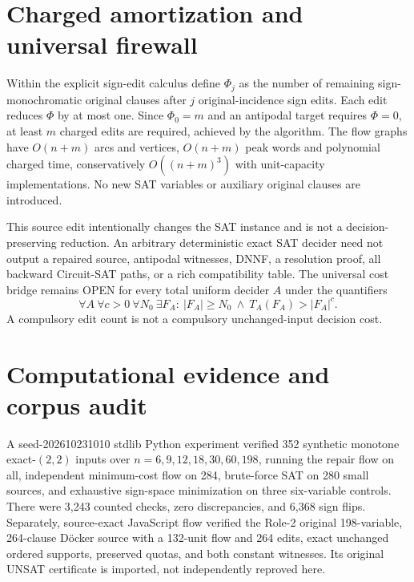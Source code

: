 \documentclass[11pt]{article}
\begin{document}
\section{Charged amortization and universal firewall}
Within the explicit sign-edit calculus define $\Phi_j$ as the number of remaining sign-monochromatic original clauses after $j$ original-incidence sign edits. Each edit reduces $\Phi$ by at most one. Since $\Phi_0=m$ and an antipodal target requires $\Phi=0$, at least $m$ charged edits are required, achieved by the algorithm. The flow graphs have $O(n+m)$ arcs and vertices, $O(n+m)$ peak words and polynomial charged time, conservatively $O((n+m)^3)$ with unit-capacity implementations. No new SAT variables or auxiliary original clauses are introduced.

This source edit intentionally changes the SAT instance and is not a decision-preserving reduction. An arbitrary deterministic exact SAT decider need not output a repaired source, antipodal witnesses, DNNF, a resolution proof, all backward Circuit-SAT paths, or a rich compatibility table. The universal cost bridge remains OPEN for every total uniform decider $A$ under the quantifiers
\[
\forall A\ \forall c>0\ \forall N_0\ \exists F_A:\ 
|F_A|\ge N_0\ \land\ T_A(F_A)>|F_A|^c.
\]
A compulsory edit count is not a compulsory unchanged-input decision cost.
\section{Computational evidence and corpus audit}
A seed-202610231010 stdlib Python experiment verified 352 synthetic monotone exact-$(2,2)$ inputs over $n=6,9,12,18,30,60,198$, running the repair flow on all, independent minimum-cost flow on 284, brute-force SAT on 280 small sources, and exhaustive sign-space minimization on three six-variable controls. There were 3,243 counted checks, zero discrepancies, and 6,368 sign flips. Separately, source-exact JavaScript flow verified the Role-2 original 198-variable, 264-clause D\"ocker source with a 132-unit flow and 264 edits, exact unchanged ordered supports, preserved quotas, and both constant witnesses. Its original UNSAT certificate is imported, not independently reproved here.
\end{document}

